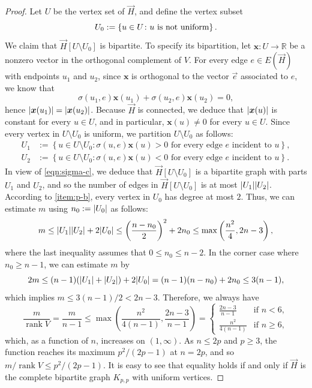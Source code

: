 \documentclass[11pt]{article}
\theoremstyle{definition}
\theoremstyle{remark}
\DeclareMathOperator{\rank}{rank}
\DeclarePairedDelimiter\abs{\lvert}{\rvert}
\newcommand{\dset}[2]{\left\{{#1}\colon{#2}\right\}}
\newcommand{\R}{\mathbb{R}}
\newcommand{\bx}{\bm{x}}
\begin{document}
\begin{proof}
    Let $U$ be the vertex set of $\vec{H}$, and define the vertex subset
    \[
        U_0 := \dset{u \in U}{u \text{ is \emph{not} uniform}}.
    \]
    We claim that $\vec{H}[U \setminus U_0]$ is bipartite. To specify its bipartition, let $\bx\colon U \to \R$ be a nonzero vector in the orthogonal complement of $V$. For every edge $e\in E(\vec{H})$ with endpoints $u_1$ and $u_2$, since $\bx$ is orthogonal to the vector $\vec{e}$ associated to $e$, we know that
    \begin{equation} \label{eqn:sigma-c}
        \sigma(u_1, e)\bx(u_1) + \sigma(u_2, e)\bx(u_2) = 0,
    \end{equation}
    hence $\abs{\bx(u_1)} = \abs{\bx(u_2)}$. Because $\vec{H}$ is connected, we deduce that $\abs{\bx(u)}$ is constant for every $u \in U$, and in particular, $\bx(u) \neq 0$ for every $u \in U$. Since every vertex in $U \setminus U_0$ is uniform, we partition $U \setminus U_0$ as follows:
    \begin{align*}
        U_1 & := \dset{u \in U \setminus U_0}{\sigma(u, e)\bx(u) > 0 \text{ for every edge }e \text{ incident to }u}, \\
        U_2 & := \dset{u \in U \setminus U_0}{\sigma(u, e)\bx(u) < 0 \text{ for every edge }e \text{ incident to }u}.
    \end{align*}
    In view of \eqref{eqn:sigma-c}, we deduce that $\vec{H}[U \setminus U_0]$ is a bipartite graph with parts $U_1$ and $U_2$, and so the number of edges in $\vec{H}[U \setminus U_0]$ is at most $\abs{U_1}\abs{U_2}$. According to \ref{item:p-b}, every vertex in $U_0$ has degree at most $2$. Thus, we can estimate $m$ using $n_0 := \abs{U_0}$ as follows:
    \[
        m \le \abs{U_1}\abs{U_2} + 2\abs{U_0} \le \left(\frac{n - n_0}{2}\right)^2 + 2n_0 \le \max\left(\frac{n^2}{4}, 2n-3\right),
    \]
    where the last inequality assumes that $0 \le n_0 \le n-2$. In the corner case where $n_0 \ge n-1$, we can estimate $m$ by
    \[
        2m \le (n-1)(\abs{U_1} + \abs{U_2}) + 2\abs{U_0} = (n-1)(n - n_0) + 2n_0 \le 3(n-1),
    \]
    which implies $m \le 3(n-1)/2 < 2n-3$. Therefore, we always have
    \[
        \frac{m}{\rank V} = \frac{m}{n-1} \le \max\left(\frac{n^2}{4(n-1)}, \frac{2n-3}{n-1}\right) = \begin{cases}
            \frac{2n-3}{n-1} & \text{if }n < 6, \\
            \frac{n^2}{4(n-1)} & \text{if }n \ge 6,
        \end{cases}
    \]
    which, as a function of $n$, increases on $(1,\infty)$. As $n \le 2p$ and $p \ge 3$, the function reaches its maximum $p^2/(2p-1)$ at $n = 2p$, and so $m/\rank V \le p^2/(2p-1)$. It is easy to see that equality holds if and only if $\vec{H}$ is the complete bipartite graph $K_{p,p}$ with uniform vertices.


\end{proof}
\end{document}
